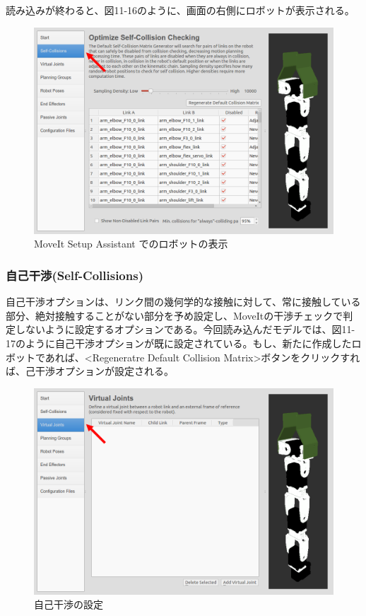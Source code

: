 読み込みが終わると、図11-16のように、画面の右側にロボットが表示される。

\begin{figure}[ht]
  \centering
  \includegraphics[width=\columnwidth]{pictures/chapter11/pic_11_16.png}
  \caption{MoveIt Setup Assistant でのロボットの表示}
\end{figure}

\subsubsection{自己干渉(Self-Collisions)}

自己干渉オプションは、リンク間の幾何学的な接触に対して、常に接触している部分、絶対接触することがない部分を予め設定し、MoveItの干渉チェックで判定しないように設定するオプションである。今回読み込んだモデルでは、図11-17のように自己干渉オプションが既に設定されている。もし、新たに作成したロボットであれば、<Regeneratre Default Collision Matrix>ボタンをクリックすれば、己干渉オプションが設定される。

\begin{figure}[ht]
  \centering
  \includegraphics[width=\columnwidth]{pictures/chapter11/pic_11_17.png}
  \caption{自己干渉の設定}
\end{figure}

